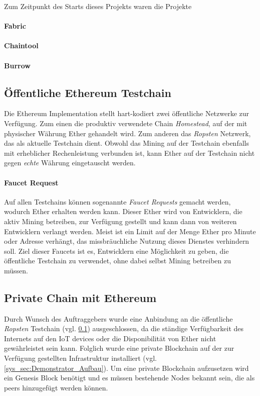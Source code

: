 Zum Zeitpunkt des Starts dieses Projekts waren die Projekte 
\paragraph{Fabric}
\paragraph{Chaintool}
\paragraph{Burrow}

\subsection{Öffentliche Ethereum Testchain}
\label{subsec:oeffentliche_testchain}
Die Ethereum Implementation stellt hart-kodiert zwei öffentliche Netzwerke zur Verfügung. Zum einen die produktiv verwendete Chain \emph{Homestead}, auf der mit physischer Währung Ether gehandelt wird\cite[{Kapitel Ether}]{ethereum-homestead.readthedocs.io}. Zum anderen das \emph{Ropsten} Netzwerk, das als aktuelle Testchain dient. Obwohl das Mining auf der Testchain ebenfalls mit erheblicher Rechenleistung verbunden ist, kann Ether auf der Testchain nicht gegen \emph{echte} Währung eingetauscht werden.

\paragraph{Faucet Request}
\label{para:Faucet_Request}
Auf allen Testchains können sogenannte \emph{Faucet Requests} gemacht werden, wodurch Ether erhalten werden kann. Dieser Ether wird von Entwicklern, die aktiv Mining betreiben, zur Verfügung gestellt und kann dann von weiteren Entwicklern verlangt werden. Meist ist ein Limit auf der Menge Ether pro Minute oder Adresse verhängt, das missbräuchliche Nutzung dieses Dienstes verhindern soll. Ziel dieser Faucets ist es, Entwicklern eine Möglichkeit zu geben, die öffentliche Testchain zu verwendet, ohne dabei selbst Mining betreiben zu müssen.\cite{blog.b9lab.com/faucet,ethereum.stackexchange.com/faucets}

\subsection{Private Chain mit Ethereum}
Durch Wunsch des Auftraggebers wurde eine Anbindung an die öffentliche \emph{Ropsten} Testchain (vgl. \ref{subsec:oeffentliche_testchain}) ausgeschlossen, da die ständige Verfügbarkeit des Internets auf den IoT devices oder die Disponibilität von Ether nicht gewährleistet sein kann. Folglich wurde eine private Blockchain auf der zur Verfügung gestellten Infrastruktur installiert (vgl. \ref{sys_sec:Demonstrator_Aufbau}). Um eine private Blockchain aufzusetzen wird ein Genesis Block benötigt und es müssen bestehende Nodes bekannt sein, die als peers hinzugefügt werden können.

